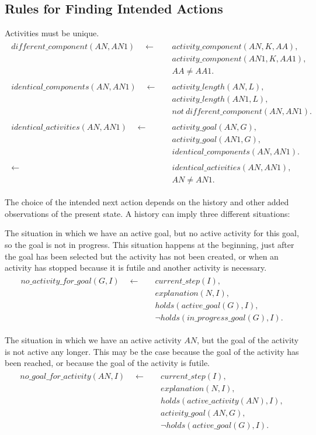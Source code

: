 \documentclass[11pt, oneside]{article}
\begin{document}
\subsection{Rules for Finding Intended Actions}
Activities must be unique.
\begin{align}\begin{split}
different\_component(AN,AN1)\quad \leftarrow \quad &activity\_component(AN,K,AA),\\
&activity\_component(AN1, K, AA1),\\
&AA \neq AA1.\\
\\
identical\_components(AN,AN1)\quad \leftarrow \quad &activity\_length(AN,L),\\ 
&activity\_length(AN1,L),\\
&not\ different\_component(AN,AN1).\\
\\
identical\_activities(AN,AN1)\quad \leftarrow \quad &activity\_goal(AN,G), \\ 
&activity\_goal(AN1,G),\\
&identical\_components(AN,AN1).\\
\\
\leftarrow \quad &identical\_activities(AN,AN1),\\
&AN\neq AN1.
\end{split}\end{align}


The choice of the intended next action depends on the history and other added observations of the present state. 
A history can imply three different situations:


The situation in which we have an active goal, but no active activity for this goal, so the goal is not in progress. This situation happens at the beginning, just after the goal has been selected but the activity has not been created, or when an activity has  stopped because it is futile and another activity is necessary.
\begin{align}\begin{split}
no\_activity\_for\_goal(G,I)\quad \leftarrow \quad &current\_step(I),\\
&explanation(N,I),\\
&holds(active\_goal(G),I),\\
&\neg holds(in\_progress\_goal(G),I).
\end{split}\end{align}

The situation in which  we have an active activity $AN$, but the goal of the activity is not active any longer. This may be the case because the goal of the activity has been reached, or because  the goal of the activity is futile. \begin{align}\begin{split}
no\_goal\_for\_activity(AN,I)\quad \leftarrow \quad &current\_step(I),\\
&explanation(N,I),\\
&holds(active\_activity(AN),I),\\
&activity\_goal(AN,G),\\
&\neg holds(active\_goal(G),I).
\end{split}\end{align}
\end{document}
